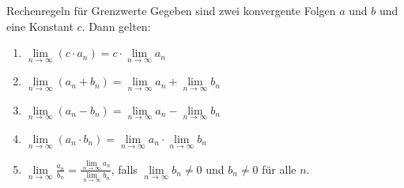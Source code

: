 \begin{definition}{Rechenregeln für Grenzwerte}
    Gegeben sind zwei konvergente Folgen $a$ und $b$ und eine Konstant $c$.
    Dann gelten:
    \begin{enumerate}
        \item $\lim \limits_{n \rightarrow \infty} (c \cdot a_n) = c \cdot \lim \limits_{n \rightarrow \infty} a_n$
        \item $\lim \limits_{n \rightarrow \infty} (a_n + b_n) = \lim \limits_{n \rightarrow \infty} a_n + \lim \limits_{n \rightarrow \infty} b_n$
        \item $\lim \limits_{n \rightarrow \infty} (a_n - b_n) = \lim \limits_{n \rightarrow \infty} a_n - \lim \limits_{n \rightarrow \infty} b_n$
        \item $\lim \limits_{n \rightarrow \infty} (a_n \cdot b_n) = \lim \limits_{n \rightarrow \infty} a_n \cdot \lim \limits_{n \rightarrow \infty} b_n$
        \item $\lim \limits_{n \rightarrow \infty} \frac{a_n}{b_n} = \frac{\lim \limits_{n \rightarrow \infty} a_n}{\lim \limits_{n \rightarrow \infty} b_n}$, falls $\lim \limits_{n \rightarrow \infty} b_n \neq 0$ und $b_n \neq 0$ für alle $n$.
    \end{enumerate}
\end{definition}

